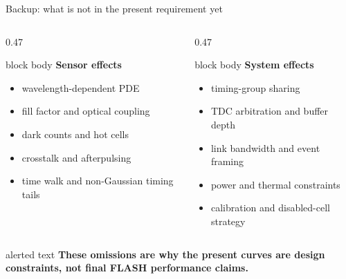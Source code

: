 \documentclass[10pt,aspectratio=169,t]{beamer}
\newcommand{\tightitem}{\setlength\itemsep{0.30em}\setlength\parskip{0pt}}
\begin{document}
\begin{frame}{Backup: what is not in the present requirement yet}
  \begin{columns}[T,onlytextwidth]
    \begin{column}{0.47\textwidth}
      \begin{beamercolorbox}[rounded=true,sep=0.22cm]{block body}
        \centering\bfseries Sensor effects
      \end{beamercolorbox}
      \begin{itemize}\tightitem
        \item wavelength-dependent PDE
        \item fill factor and optical coupling
        \item dark counts and hot cells
        \item crosstalk and afterpulsing
        \item time walk and non-Gaussian timing tails
      \end{itemize}
    \end{column}
    \begin{column}{0.47\textwidth}
      \begin{beamercolorbox}[rounded=true,sep=0.22cm]{block body}
        \centering\bfseries System effects
      \end{beamercolorbox}
      \begin{itemize}\tightitem
        \item timing-group sharing
        \item TDC arbitration and buffer depth
        \item link bandwidth and event framing
        \item power and thermal constraints
        \item calibration and disabled-cell strategy
      \end{itemize}
    \end{column}
  \end{columns}
  \vspace{0.45cm}
  \begin{beamercolorbox}[rounded=true,sep=0.28cm]{alerted text}
    \centering\bfseries These omissions are why the present curves are design constraints, not final FLASH performance claims.
  \end{beamercolorbox}
\end{frame}
\end{document}
